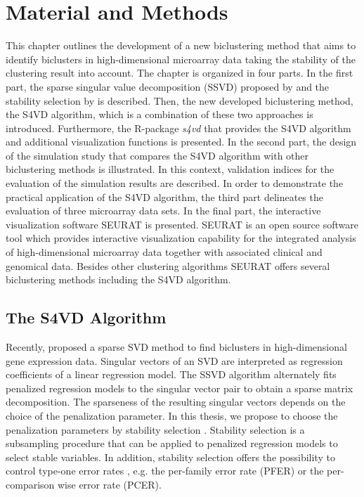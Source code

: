 \chapter{Material and Methods}
This chapter outlines the development of a new biclustering method that aims to identify biclusters in high-dimensional microarray data taking the stability of the  clustering result into account. The chapter is organized in four parts. In the first part, the sparse singular value decomposition (SSVD) proposed by \citet{Lee2010} and the stability selection by \citet{Meinshausen2010} is described. Then, the new developed biclustering method, the S4VD algorithm, which is a combination of these two approaches is introduced. Furthermore, the R-package \textit{s4vd} that provides the S4VD algorithm and additional visualization functions is presented. In the second part, the design of the simulation study that compares the S4VD algorithm with other biclustering methods is illustrated. In this context, validation indices for the evaluation of the simulation results are described. In order to demonstrate the practical application of the S4VD algorithm, the third part delineates the evaluation of three microarray data sets. In the final part, the interactive visualization software SEURAT \cite{Gribov2010} is presented. SEURAT is an open source software tool which provides interactive visualization capability for the integrated analysis of high-dimensional microarray data together with associated clinical and genomical data. Besides other clustering algorithms SEURAT offers several biclustering methods including the S4VD algorithm.

\section{The S4VD Algorithm}
Recently, \citet{Lee2010} proposed a sparse SVD method to find biclusters in high-dimensional gene expression data. Singular vectors of an SVD are interpreted as regression coefficients of a linear regression model. The SSVD algorithm alternately fits penalized regression models to the singular vector pair to obtain a sparse matrix decomposition. The sparseness of the resulting singular vectors depends on the choice of the penalization parameter. In this thesis, we propose to choose the penalization parameters by stability selection \cite{Meinshausen2010}. Stability selection is a subsampling procedure that can be applied to penalized regression models to select stable variables. In addition, stability selection offers the possibility to control type-one error rates \cite{Dudoit2003}, e.g. the per-family error rate (PFER) or the per-comparison wise error rate (PCER). 


